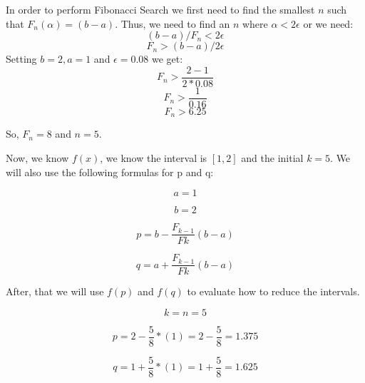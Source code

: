 \documentclass[a4paper]{article}
\begin{document}
In order to perform Fibonacci Search we first need to find the smallest $n$ such that $F_n(\alpha) = (b - a)$. Thus, we need to find an $n$ where $\alpha  < 2\epsilon$ or we need:
\begin{equation}
(b - a)/F_n < 2\epsilon
\end{equation}
\begin{equation}
F_n > (b - a)/2\epsilon
\end{equation}
Setting $b = 2, a = 1$ and $\epsilon = 0.08$ we get:
\begin{equation}
F_n > \dfrac{2 - 1}{2 * 0.08}
\end{equation}
\begin{equation}
F_n > \dfrac{1}{0.16}
\end{equation}
\begin{equation}
F_n > 6.25
\end{equation}

So, $F_n = 8$ and $n = 5$.

Now, we know $f(x)$, we know the interval is $[1, 2]$ and the initial $k = 5$.  We will also use the following formulas for p and q:

\begin{equation}
a = 1
\end{equation}

\begin{equation}
b = 2
\end{equation}

\begin{equation}
p = b - \dfrac{F_{k - 1}}{F{k}}(b - a)
\end{equation}

\begin{equation}
q = a + \dfrac{F_{k - 1}}{F{k}}(b - a)
\end{equation}

After, that we will use $f(p)$ and $f(q)$ to evaluate how to reduce the intervals.

\begin{equation}
k = n = 5
\end{equation}

\begin{equation}
p = 2 - \dfrac{5}{8} * (1) = 2 - \dfrac{5}{8} = 1.375
\end{equation}

\begin{equation}
q = 1 + \dfrac{5}{8} * (1)  = 1 + \dfrac{5}{8} = 1.625
\end{equation}
\end{document}
